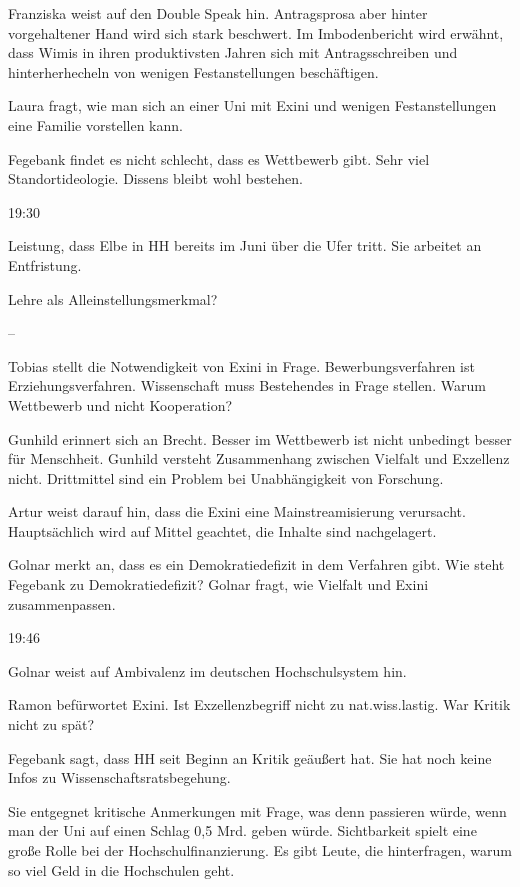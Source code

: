 \documentclass[ngerman,headheight=70pt]{scrartcl}
\begin{document}
    Franziska weist auf den Double Speak hin. Antragsprosa aber hinter
    vorgehaltener Hand wird sich stark beschwert. Im Imbodenbericht wird
    erwähnt, dass Wimis in ihren produktivsten Jahren sich mit Antragsschreiben
    und hinterherhecheln von wenigen Festanstellungen beschäftigen.

    Laura fragt, wie man sich an einer Uni mit Exini und wenigen Festanstellungen
    eine Familie vorstellen kann.

    Fegebank findet es nicht schlecht, dass es Wettbewerb gibt. Sehr viel
    Standortideologie. Dissens bleibt wohl bestehen.

    19:30

    Leistung, dass Elbe in HH bereits im Juni über die Ufer tritt.
    Sie arbeitet an Entfristung.

    Lehre als Alleinstellungsmerkmal?

    --

    Tobias stellt die Notwendigkeit von Exini in Frage. Bewerbungsverfahren
    ist Erziehungsverfahren. Wissenschaft muss Bestehendes in Frage stellen.
    Warum Wettbewerb und nicht Kooperation?

    Gunhild erinnert sich an Brecht. Besser im Wettbewerb ist nicht unbedingt
    besser für Menschheit. Gunhild versteht Zusammenhang zwischen Vielfalt
    und Exzellenz nicht. Drittmittel sind ein Problem bei Unabhängigkeit von
    Forschung.

    Artur weist darauf hin, dass die Exini eine Mainstreamisierung verursacht.
    Hauptsächlich wird auf Mittel geachtet, die Inhalte sind nachgelagert.

    Golnar merkt an, dass es ein Demokratiedefizit in dem Verfahren gibt.
    Wie steht Fegebank zu Demokratiedefizit? Golnar fragt, wie Vielfalt und
    Exini zusammenpassen.

    19:46

    Golnar weist auf Ambivalenz im deutschen Hochschulsystem hin.

    Ramon befürwortet Exini. Ist Exzellenzbegriff nicht zu nat.wiss.lastig.
    War Kritik nicht zu spät?

    Fegebank sagt, dass HH seit Beginn an Kritik geäußert hat. Sie hat noch keine
    Infos zu Wissenschaftsratsbegehung.

    Sie entgegnet kritische Anmerkungen mit Frage, was denn passieren würde, wenn
    man der Uni auf einen Schlag 0,5 Mrd. geben würde.
    Sichtbarkeit spielt eine große Rolle bei der Hochschulfinanzierung.
    Es gibt Leute, die hinterfragen, warum so viel Geld in die Hochschulen
    geht.
\end{document}
